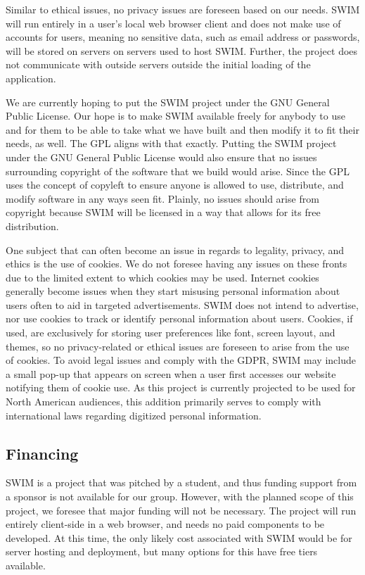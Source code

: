 \documentclass[
    paper=letter,
    parskip=half,
    fontsize=12pt,
    titlepage=firstiscover,
    toc=bibliography,
    numbers=endperiod
]{scrartcl}
\begin{document}
Similar to ethical issues, no privacy issues are foreseen based on our
needs. SWIM will run entirely in a user's local web browser client and
does not make use of accounts for users, meaning no sensitive data, such
as email address or passwords, will be stored on servers on servers used
to host SWIM. Further, the project does not communicate with outside
servers outside the initial loading of the application.

We are currently hoping to put the SWIM project under the GNU General
Public License. Our hope is to make SWIM available freely for anybody to
use and for them to be able to take what we have built and then modify
it to fit their needs, as well. The GPL aligns with that exactly.
Putting the SWIM project under the GNU General Public License would also
ensure that no issues surrounding copyright of the software that we
build would arise. Since the GPL uses the concept of copyleft to ensure
anyone is allowed to use, distribute, and modify software in any ways
seen fit. Plainly, no issues should arise from copyright because SWIM
will be licensed in a way that allows for its free distribution.

One subject that can often become an issue in regards to legality,
privacy, and ethics is the use of cookies. We do not foresee having any
issues on these fronts due to the limited extent to which cookies may be
used. Internet cookies generally become issues when they start misusing
personal information about users often to aid in targeted
advertisements. SWIM does not intend to advertise, nor use cookies to
track or identify personal information about users. Cookies, if used,
are exclusively for storing user preferences like font, screen layout,
and themes, so no privacy-related or ethical issues are foreseen to
arise from the use of cookies. To avoid legal issues and comply with the
GDPR, SWIM may include a small pop-up that appears on screen when a user
first accesses our website notifying them of cookie use. As this project
is currently projected to be used for North American audiences, this
addition primarily serves to comply with international laws regarding
digitized personal information.

\subsection{Financing}
SWIM is a project that was pitched by a student, and thus funding
support from a sponsor is not available for our group. However, with the
planned scope of this project, we foresee that major funding will not be
necessary. The project will run entirely client-side in a web browser,
and needs no paid components to be developed. At this time, the only
likely cost associated with SWIM would be for server hosting and
deployment, but many options for this have free tiers available.
\end{document}
